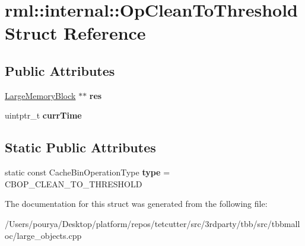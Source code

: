 \hypertarget{structrml_1_1internal_1_1OpCleanToThreshold}{}\section{rml\+:\+:internal\+:\+:Op\+Clean\+To\+Threshold Struct Reference}
\label{structrml_1_1internal_1_1OpCleanToThreshold}
\subsection*{Public Attributes}
\begin{DoxyCompactItemize}
\item 
\hypertarget{structrml_1_1internal_1_1OpCleanToThreshold_aa3b4094fce8b7405821126f3c150f5dd}{}\hyperlink{structrml_1_1internal_1_1LargeMemoryBlock}{Large\+Memory\+Block} $\ast$$\ast$ {\bfseries res}\label{structrml_1_1internal_1_1OpCleanToThreshold_aa3b4094fce8b7405821126f3c150f5dd}

\item 
\hypertarget{structrml_1_1internal_1_1OpCleanToThreshold_a845bcd3da63851ae558264c320af0bdf}{}uintptr\+\_\+t {\bfseries curr\+Time}\label{structrml_1_1internal_1_1OpCleanToThreshold_a845bcd3da63851ae558264c320af0bdf}

\end{DoxyCompactItemize}
\subsection*{Static Public Attributes}
\begin{DoxyCompactItemize}
\item 
\hypertarget{structrml_1_1internal_1_1OpCleanToThreshold_a904154bbd957ec3a458adc8000974d2e}{}static const Cache\+Bin\+Operation\+Type {\bfseries type} = C\+B\+O\+P\+\_\+\+C\+L\+E\+A\+N\+\_\+\+T\+O\+\_\+\+T\+H\+R\+E\+S\+H\+O\+L\+D\label{structrml_1_1internal_1_1OpCleanToThreshold_a904154bbd957ec3a458adc8000974d2e}

\end{DoxyCompactItemize}


The documentation for this struct was generated from the following file\+:\begin{DoxyCompactItemize}
\item 
/\+Users/pourya/\+Desktop/platform/repos/tetcutter/src/3rdparty/tbb/src/tbbmalloc/large\+\_\+objects.\+cpp\end{DoxyCompactItemize}
